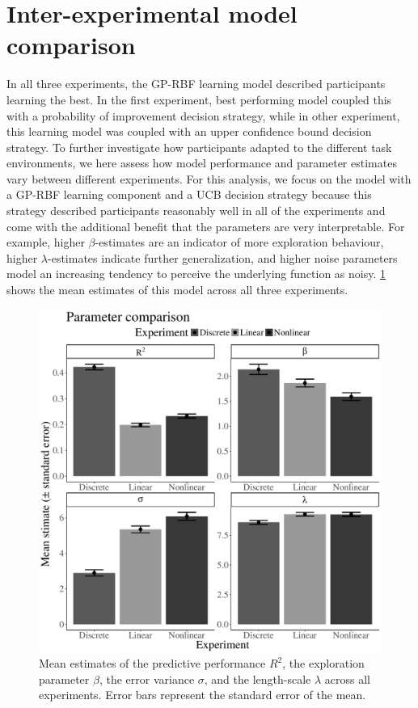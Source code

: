 \documentclass[a4paper,natbib]{apa6}
\begin{document}
\section{Inter-experimental model comparison}

In all three experiments, the GP-RBF learning model described participants learning the best. In the first experiment, best performing model coupled this with a probability of improvement decision strategy, while in other experiment, this learning model was coupled with an upper confidence bound decision strategy. 
To further investigate how participants adapted to the different task environments, we here assess how model performance and parameter estimates vary between different experiments. For this analysis, we focus on the model with a GP-RBF learning component and a UCB decision strategy because this strategy described participants reasonably well in all of the experiments and come with the additional benefit that the parameters are very interpretable. For example, higher $\beta$-estimates are an indicator of more exploration behaviour, higher $\lambda$-estimates indicate further generalization, and higher noise parameters model an increasing tendency to perceive the underlying function as noisy. \ref{fig:parcomp} shows the mean estimates of this model across all three experiments.
\begin{figure}[ht!]
\centering
\includegraphics[scale=0.5]{paracomp.pdf}
\caption{Mean estimates of the predictive performance $R^2$, the exploration parameter $\beta$, the error variance $\sigma$, and the length-scale $\lambda$ across all experiments. Error bars represent the standard error of the mean.}
\label{fig:parcomp}
\end{figure}
\end{document}
